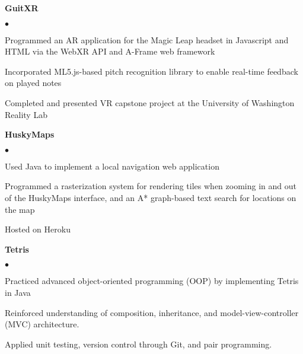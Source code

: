 \documentclass[margin,line]{res}
\newenvironment{list2}{
  \begin{list}{$\bullet$}{%
      \setlength{\itemsep}{0in}
      \setlength{\parsep}{0in} \setlength{\parskip}{0in}
      \setlength{\topsep}{0in} \setlength{\partopsep}{0in} 
      \setlength{\leftmargin}{0.2in}}}{\end{list}}
\begin{document}
\begin{resume}

{\bf GuitXR} %
\begin{list2}
\item Programmed an AR application for the Magic Leap headset in Javascript and HTML via the WebXR API and A-Frame web framework
\item Incorporated ML5.js-based pitch recognition library to enable real-time feedback on played notes
\item Completed and presented VR capstone project at the University of Washington Reality Lab
\end{list2}

{\bf HuskyMaps} %
\begin{list2}
	\item Used Java to implement a local navigation web application
	\item Programmed a rasterization system for rendering tiles when zooming in and out of the HuskyMaps interface, and an A* graph-based text search for locations on the map
	\item Hosted on Heroku
\end{list2}

{\bf Tetris} %
\begin{list2}
\item Practiced advanced object-oriented programming (OOP) by implementing Tetris in Java
\item Reinforced understanding of composition, inheritance, and model-view-controller (MVC) architecture. 
\item Applied unit testing, version control through Git, and pair programming.
\end{list2}


\vspace{-.2cm}

\end{resume}
\end{document}
